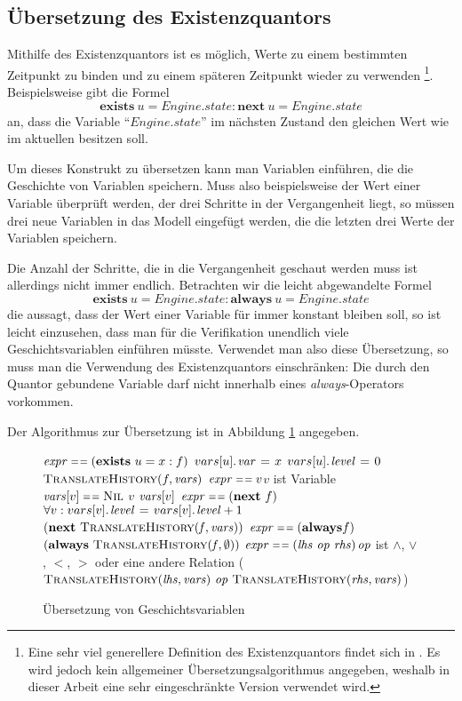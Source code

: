 \subsection{Übersetzung des Existenzquantors}
Mithilfe des Existenzquantors ist es möglich, Werte zu einem bestimmten Zeitpunkt zu binden und zu einem späteren Zeitpunkt wieder zu verwenden
\footnote{Eine sehr viel generellere Definition des Existenzquantors findet sich in \cite{exists_quantor}.
  Es wird jedoch kein allgemeiner Übersetzungsalgorithmus angegeben, weshalb in dieser Arbeit eine sehr eingeschränkte Version verwendet wird.
}.
Beispielsweise gibt die Formel
\[ \textbf{exists}\ u = \mathit{Engine}.\mathit{state} : \textbf{next}\ u = \mathit{Engine}.\mathit{state} \]
an, dass die Variable "`$\mathit{Engine}.\mathit{state}$"' im nächsten Zustand den gleichen Wert wie im aktuellen besitzen soll.

Um dieses Konstrukt zu übersetzen kann man Variablen einführen, die die Geschichte von Variablen speichern.
Muss also beispielsweise der Wert einer Variable überprüft werden, der drei Schritte in der Vergangenheit liegt, so müssen drei neue Variablen in das Modell eingefügt werden, die die letzten drei Werte der Variablen speichern.

Die Anzahl der Schritte, die in die Vergangenheit geschaut werden muss ist allerdings nicht immer endlich.
Betrachten wir die leicht abgewandelte Formel
\[ \textbf{exists}\ u = \mathit{Engine}.\mathit{state} : \textbf{always}\ u = \mathit{Engine}.\mathit{state} \]
die aussagt, dass der Wert einer Variable für immer konstant bleiben soll, so ist leicht einzusehen, dass man für die Verifikation unendlich viele Geschichtsvariablen einführen müsste.
Verwendet man also diese Übersetzung, so muss man die Verwendung des Existenzquantors einschränken:
Die durch den Quantor gebundene Variable darf nicht innerhalb eines \emph{always}-Operators vorkommen.

Der Algorithmus zur Übersetzung ist in Abbildung \ref{fig:translate_history} angegeben.
\begin{figure}[h]
\begin{codebox}
\li \If $\id{expr}\isequal (\textbf{exists}\ u=x : f)$ \Then
\li $\attrib{vars[u]}{var}\gets x$
\li $\attrib{vars[u]}{level}\gets 0$
\li \Return $\proc{TranslateHistory}(f,\id{vars})$
\li \ElseIf $\id{expr}\isequal v$\>\>\>\>\>\>\Comment$v$ ist Variable
\Then
\li \If $\id{vars}[v]\isequal\const{Nil}$\Then
\li \Return $v$
\li \Else \Return $\id{vars}[v]$
\End
\li \ElseIf $\id{expr}\isequal (\textbf{next}\ f)$\Then
\li $\forall v: \attrib{vars[v]}{level}\gets \attrib{vars[v]}{level}+1$
\li \Return $(\textbf{next}\ \proc{TranslateHistory}(\id{f},\id{vars}))$
\li \ElseIf $\id{expr}\isequal (\textbf{always} f)$\Then
\li \Return $(\textbf{always}\ \proc{TranslateHistory}(\id{f},\emptyset))$
\li \ElseIf $\id{expr}\isequal (\id{lhs}\ \id{op}\ \id{rhs})$\>\>\>\>\>\>\Comment $\id{op}$ ist $\land$, $\lor$, $<$, $>$ oder eine andere Relation
\Then
\li \Return ($\proc{TranslateHistory}(\id{lhs},\id{vars})\ \id{op}\ \proc{TranslateHistory}(\id{rhs},\id{vars})$)
\End
\end{codebox}
\caption{Übersetzung von Geschichtsvariablen}
\label{fig:translate_history}
\end{figure}